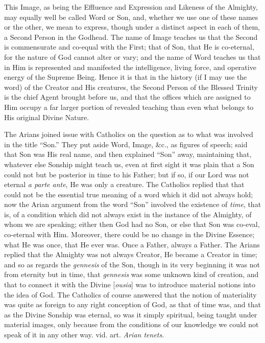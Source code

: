 This Image, as being the Effluence and Expression
and Likeness of the Almighty, may equally well be called Word or Son,
and, whether we use one of these names or the other, we mean to
express, though under a distinct aspect in each of them, a Second
Person in the Godhead. The name of Image teaches us that the Second is
commensurate and co-equal with the First; that of Son, that He is
co-eternal, for the nature of God cannot alter or vary; and the name
of Word teaches us that in Him is represented and manifested the
intelligence, living force, and operative energy of the Supreme Being.
Hence it is that in the history (if I may use the word) of the Creator
and His creatures, the Second Person of the Blessed Trinity is the
chief Agent brought before us, and that the offices which are assigned
to Him occupy a far larger portion of revealed teaching than even what
belongs to His original Divine Nature.

The Arians joined issue with Catholics on the
question as to what was involved in the title ``Son.'' They put aside
Word, Image, \&c., as figures of speech; said that Son was His real
name, and then explained ``Son'' away, maintaining that, whatever else
Sonship might teach us, even at first sight it was plain that a Son
could not but be posterior in time to his Father; but if so, if our
Lord was not eternal \emph{a parte ante}, He was only a creature. The
Catholics replied that that could not be the essential true meaning of
a word which it did not always hold; now the Arian argument from the
word ``Son'' involved the existence of \emph{time}, that is, of a
condition which did not always exist in the instance of the Almighty,
of whom we are speaking; either then God had no Son, or else that Son
was co-eval, co-eternal with Him. Moreover, there could be no change
in the Divine Essence; what He was once, that He ever was. Once a
Father, always a Father. The Arians replied that the Almighty was not
always Creator, He became a Creator in time; and so as regards the \emph{gennesis}
of the Son, though in its very beginning it was not from eternity but
in time, that \emph{gennesis} was some unknown kind of creation, and
that to connect it with the Divine [\emph{ousia}] was to introduce
material notions into the idea of God. The Catholics of course
answered that the notion of materiality was quite as foreign to any
right conception of God, as that of time was, and that as the Divine
Sonship was eternal, so was it simply spiritual, being taught under
material images, only because from the conditions of our knowledge we
could not speak of it in any other way. vid. art. \emph{Arian tenets}.

